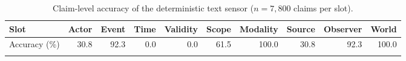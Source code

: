 \begin{table}[h]
\caption{Claim-level accuracy of the deterministic text sensor
($n=7{,}800$ claims per slot).}
\label{tab:slot-sensing}
\centering\scriptsize
\setlength{\tabcolsep}{3pt}%
\begin{tabular}{lrrrrrrrrr}
\toprule
Slot & Actor & Event & Time & Validity & Scope & Modality & Source & Observer & World\\
\midrule
Accuracy (\%) & 30.8 & 92.3 & 0.0 & 0.0 & 61.5 & 100.0 & 30.8 & 92.3 & 100.0\\
\botrule
\end{tabular}
\end{table}
